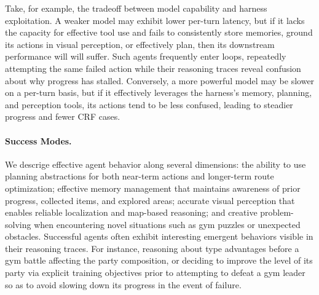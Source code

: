 Take, for example, the tradeoff between model capability and harness exploitation. A weaker model may exhibit lower per-turn latency, but if it lacks the capacity for effective tool use and fails to consistently store memories, ground its actions in visual perception, or effectively plan, then its downstream performance will will suffer. Such agents frequently enter loops, repeatedly attempting the same failed action while their reasoning traces reveal confusion about why progress has stalled. Conversely, a more powerful model may be slower on a per-turn basis, but if it effectively leverages the harness's memory, planning, and perception tools, its actions tend to be less confused, leading to steadier progress and fewer CRF cases.

\paragraph{Success Modes.} We descrige effective agent behavior along several dimensions: the ability to use planning abstractions for both near-term actions and longer-term route optimization; effective memory management that maintains awareness of prior progress, collected items, and explored areas; accurate visual perception that enables reliable localization and map-based reasoning; and creative problem-solving when encountering novel situations such as gym puzzles or unexpected obstacles. Successful agents often exhibit interesting emergent behaviors visible in their reasoning traces. For instance, reasoning about type advantages before a gym battle affecting the party composition, or deciding to improve the level of its party via explicit training objectives prior to attempting to defeat a gym leader so as to avoid slowing down its progress in the event of failure. 

